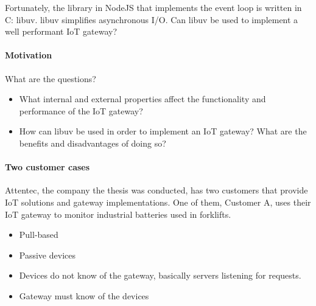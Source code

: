 \documentclass{memoir}
\begin{document}
Fortunately, the library in NodeJS that implements the event loop is written in
C: libuv. libuv simplifies asynchronous I/O. Can libuv be used to implement a
well performant IoT gateway?

\paragraph{Motivation}


%

What are the questions?

\begin{itemize}
    \item What internal and external properties affect the
        functionality and performance of the IoT gateway?

    \item How can libuv be used in order to implement an IoT gateway?
        What are the benefits and disadvantages of doing so?
\end{itemize}

\paragraph{Two customer cases}

Attentec, the company the thesis was conducted, has two customers that provide
IoT solutions and gateway implementations. One of them, Customer A, uses their
IoT gateway to monitor industrial batteries used in forklifts.

\begin{itemize}
    \item Pull-based
    \item Passive devices
    \item Devices do not know of the gateway, basically servers listening for
        requests.
    \item Gateway must know of the devices
\end{itemize}
\end{document}

